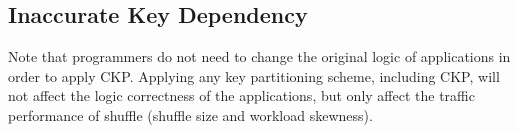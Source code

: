 \documentclass[10pt,journal,compsoc]{IEEEtran}
\begin{document}






\subsection{Inaccurate Key Dependency}\label{section:inaccurate}
Note that programmers do not need to change the original logic of
applications in order to apply CKP.
Applying any key partitioning scheme, including CKP, will not affect
the logic correctness of the applications, but only affect the traffic 
performance of shuffle (shuffle size and workload skewness). 
\end{document}

